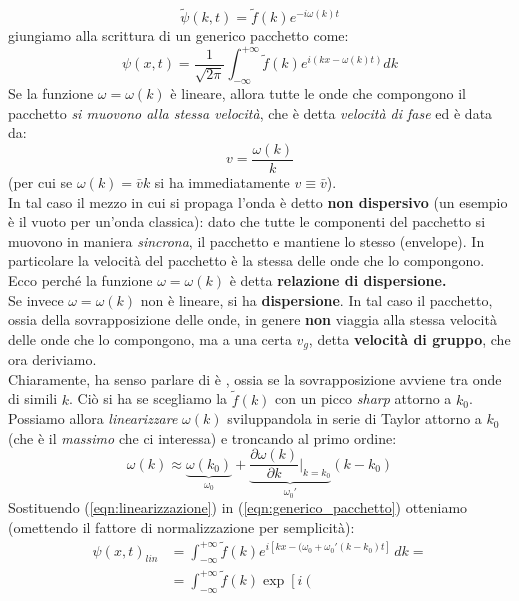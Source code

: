 \documentclass[../../FisicaTeorica.tex]{subfiles}
\begin{document}
\begin{expl}
\[
\tilde{\psi}(k,t)=\tilde{f}(k)e^{-i\omega(k)t}
\]
giungiamo alla scrittura di un generico pacchetto come:
\begin{equation}
\psi(x,t)=\frac{1}{\sqrt{2\pi}}\int_{-\infty}^{+\infty}\tilde{f}(k) e^{i(kx-\omega(k)t)}dk
\label{eqn:generico_pacchetto}
\end{equation}
Se la funzione $\omega=\omega(k)$ è lineare, allora tutte le onde che compongono il pacchetto \textit{si muovono alla stessa velocità}, che è detta \textit{velocità di fase} ed è data da:
\[
v=\frac{\omega(k)}{k}
\]
(per cui se $\omega(k)=\bar{v}k$ si ha immediatamente $v\equiv \bar{v}$).\\
In tal caso il mezzo in cui si propaga l'onda è detto \textbf{non dispersivo} (un esempio è il vuoto per un'onda classica): dato che tutte le componenti del pacchetto si muovono in maniera \textit{sincrona}, il pacchetto  e mantiene lo stesso  (envelope). In particolare la velocità del pacchetto è la stessa delle onde che lo compongono. Ecco perché la funzione $\omega = \omega(k)$ è detta \textbf{relazione di dispersione.}\\
Se invece $\omega=\omega(k)$ non è lineare, si ha \textbf{dispersione}. In tal caso il pacchetto, ossia  della sovrapposizione delle onde, in genere \textbf{non} viaggia alla stessa velocità delle onde che lo compongono, ma a una certa $v_g$, detta \textbf{velocità di gruppo}, che ora deriviamo.\\
Chiaramente, ha senso parlare di  è , ossia se la sovrapposizione avviene tra onde di simili $k$. Ciò si ha se scegliamo la $\tilde{f}(k)$ con un picco \textit{sharp} attorno a $k_0$. Possiamo allora \textit{linearizzare} $\omega(k)$ sviluppandola in serie di Taylor attorno a $k_0$ (che è il \textit{massimo} che ci interessa) e troncando al primo ordine:
\begin{equation}
\omega(k)\approx \underbrace{\omega(k_0)}_{\omega_0} + \underbrace{\frac{\partial \omega(k)}{\partial k}\Big|_{k=k_0}}_{\omega_0'}(k-k_0)
\label{eqn:linearizzazione}
\end{equation}
Sostituendo (\ref{eqn:linearizzazione}) in (\ref{eqn:generico_pacchetto}) otteniamo (omettendo il fattore di normalizzazione per semplicità):
\begin{align*}
\psi(x,t)_{lin}&=\int_{-\infty}^{+\infty}\tilde{f}(k)e^{i[kx-(\omega_0+\omega_0'(k-k_0)t]}\,dk=\\
&=\int_{-\infty}^{+\infty}\tilde{f}(k)\exp\left [i\left(

\end{align*}
\end{expl}
\end{document}
